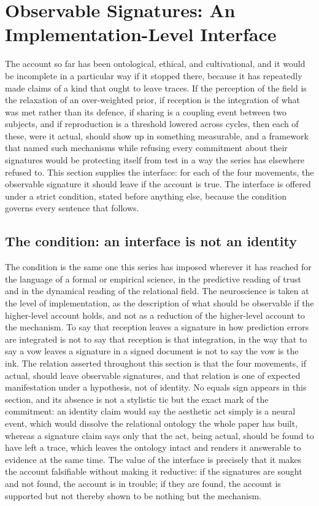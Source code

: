 \section{Observable Signatures: An Implementation-Level Interface}
\label{p22:sec:neuro}

\noindent
The account so far has been ontological, ethical, and cultivational, and it would be incomplete in a particular way if it stopped there, because it has repeatedly made claims of a kind that ought to leave traces. If the perception of the field is the relaxation of an over-weighted prior, if reception is the integration of what was met rather than its defence, if sharing is a coupling event between two subjects, and if reproduction is a threshold lowered across cycles, then each of these, were it actual, should show up in something measurable, and a framework that named such mechanisms while refusing every commitment about their signatures would be protecting itself from test in a way the series has elsewhere refused to. This section supplies the interface: for each of the four movements, the observable signature it should leave if the account is true. The interface is offered under a strict condition, stated before anything else, because the condition governs every sentence that follows.

\subsection{The condition: an interface is not an identity}
\label{p22:sub:neuro-condition}

The condition is the same one this series has imposed wherever it has reached for the language of a formal or empirical science, in the predictive reading of trust and in the dynamical reading of the relational field. The neuroscience is taken at the level of implementation, as the description of what should be observable if the higher-level account holds, and not as a reduction of the higher-level account to the mechanism. To say that reception leaves a signature in how prediction errors are integrated is not to say that reception is that integration, in the way that to say a vow leaves a signature in a signed document is not to say the vow is the ink. The relation asserted throughout this section is that the four movements, if actual, should leave observable signatures, and that relation is one of expected manifestation under a hypothesis, not of identity. No equals sign appears in this section, and its absence is not a stylistic tic but the exact mark of the commitment: an identity claim would say the aesthetic act simply is a neural event, which would dissolve the relational ontology the whole paper has built, whereas a signature claim says only that the act, being actual, should be found to have left a trace, which leaves the ontology intact and renders it answerable to evidence at the same time. The value of the interface is precisely that it makes the account falsifiable without making it reductive: if the signatures are sought and not found, the account is in trouble; if they are found, the account is supported but not thereby shown to be nothing but the mechanism.

